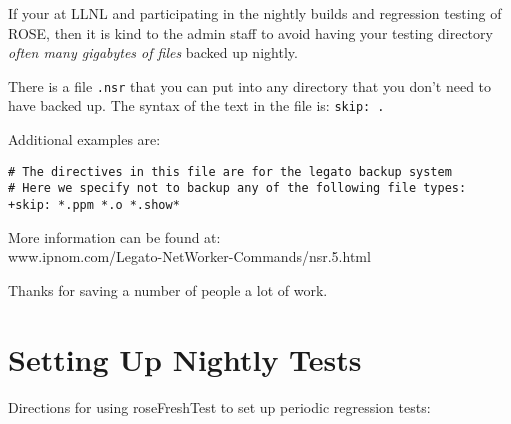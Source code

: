    If your at LLNL and participating in the nightly builds and
regression testing of ROSE, then it is kind to the admin staff
to avoid having your testing directory 
{\em often many gigabytes of files} backed up nightly.

   There is a file {\tt .nsr} that you can put into
any directory that you don't need to have backed up.
The syntax of the text in the file is:
{\tt skip: .}

Additional examples are:
\begin{verbatim}
# The directives in this file are for the legato backup system
# Here we specify not to backup any of the following file types:
+skip: *.ppm *.o *.show*
\end{verbatim}

More information can be found at: \\
   www.ipnom.com/Legato-NetWorker-Commands/nsr.5.html

Thanks for saving a number of people a lot of work.


\section{Setting Up Nightly Tests}

Directions for using roseFreshTest to set up periodic regression tests:

